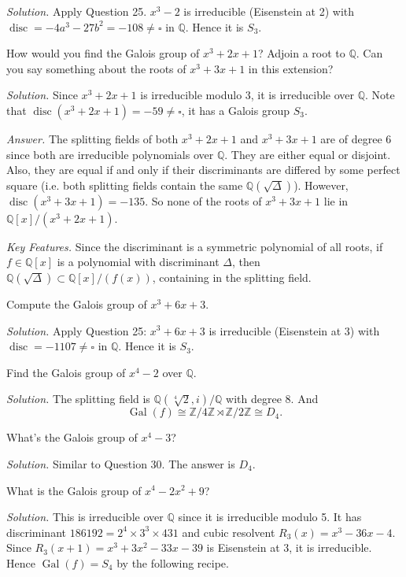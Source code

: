 \documentclass{mathproblems}
\newcommand\Q{\mathbb{Q}}
\newcommand\Z{\mathbb{Z}}
\DeclareMathOperator{\Gal}{Gal}
\DeclareMathOperator{\disc}{disc}
\begin{document}
\begin{questions}
\textit{Solution.}
Apply Question 25. $x^{3}-2$ is irreducible (Eisenstein at 2) with $\operatorname{disc}=-4a^3-27b^2=-108 \neq \square$ in $\Q$. Hence it is $S_3$.

\miquestion
{\color{blue} How would you find the Galois group of $x^{3}+2 x+1$? Adjoin a root to $\Q$. Can you say something about the roots of $x^{3}+3 x+1$ in this extension?}

\textit{Solution.} Since $x^{3}+2 x+1$ is irreducible modulo 3, it is irreducible over $\Q$. Note that $\disc(x^{3}+2 x+1)=-59\neq \square$, it has a Galois group $S_3$.

\textit{Answer.} The splitting fields of both $x^{3}+2 x+1$ and $x^{3}+3 x+1$ are of degree 6 since both are irreducible polynomials over $\Q$. They are either equal or disjoint. Also, they are equal if and only if their discriminants are differed by some perfect square (i.e. both splitting fields contain the same $\Q(\sqrt{\Delta})$). However, $\disc(x^{3}+3 x+1)=-135$. So none of the roots of $x^3+3x+1$ lie in $\Q[x]/(x^3+2x+1)$.

{\color{violet} \textit{Key Features.} Since the discriminant is a symmetric polynomial of all roots, if $f\in \Q[x]$ is a polynomial with discriminant $\Delta$, then $\Q(\sqrt{\Delta})\subset \Q[x]/(f(x))$, containing in the splitting field.}

\miquestion
{\color{blue} Compute the Galois group of $x^{3}+6 x+3$.}

\textit{Solution.}
Apply Question 25: $x^{3}+6 x+3$ is irreducible (Eisenstein at 3) with $\operatorname{disc}=-1107 \neq \square$ in $\Q$. Hence it is $S_3$.

\miquestion
{\color{blue} Find the Galois group of $x^{4}-2$ over $\Q$.}

\textit{Solution.}
The splitting field is $\Q(\sqrt[4]{2},i)/\Q$ with degree 8. And
$$
\Gal(f)\cong \Z/4\Z \rtimes \Z/2\Z\cong D_4.
$$

\miquestion
{\color{blue} What's the Galois group of $x^{4}-3$?}

\textit{Solution.}
Similar to Question 30. The answer is $D_4$.

\miquestion
{\color{blue} What is the Galois group of $x^{4}-2 x^{2}+9$?}

\textit{Solution.}
This is irreducible over $\Q$ since it is irreducible modulo 5. It has discriminant $186192=2^4\times 3^3\times 431$ and cubic resolvent $R_3(x)=x^3-36x-4$. Since $R_3(x+1)=x^3 + 3 x^2 - 33 x - 39$ is Eisenstein at 3, it is irreducible. Hence $\Gal(f)=S_4$ by the following recipe.


\end{questions}
\end{document}
